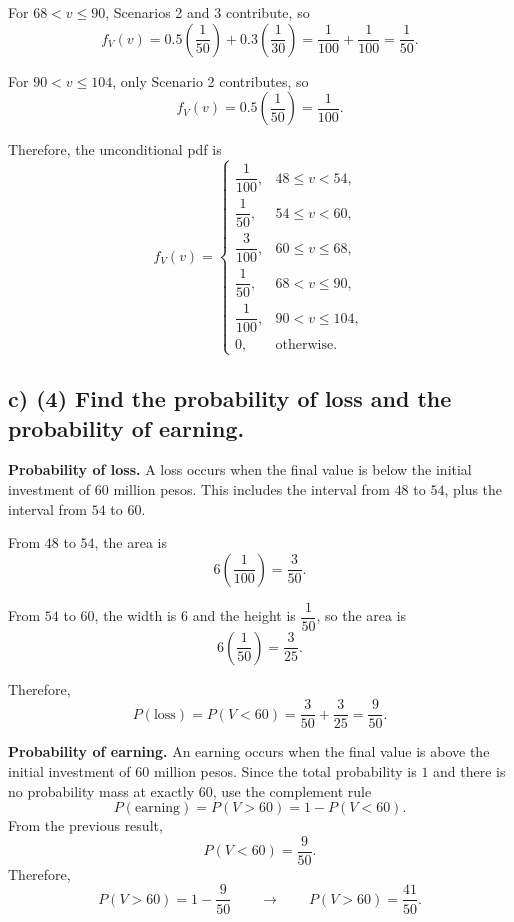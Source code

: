 For $68<v\le 90$, Scenarios 2 and 3 contribute, so
\[
f_V(v)=0.5\left(\frac{1}{50}\right)+0.3\left(\frac{1}{30}\right)
=\frac{1}{100}+\frac{1}{100}
=\frac{1}{50}.
\]

For $90<v\le 104$, only Scenario 2 contributes, so
\[
f_V(v)=0.5\left(\frac{1}{50}\right)=\frac{1}{100}.
\]

Therefore, the unconditional pdf is
\[
f_V(v)=
\begin{cases}
	\dfrac{1}{100}, & 48\le v<54,\\[6pt]
	\dfrac{1}{50}, & 54\le v<60,\\[6pt]
	\dfrac{3}{100}, & 60\le v\le 68,\\[6pt]
	\dfrac{1}{50}, & 68<v\le 90,\\[6pt]
	\dfrac{1}{100}, & 90<v\le 104,\\[6pt]
	0, & \text{otherwise.}
\end{cases}
\]



\subsection*{c) \textbf{(4)} Find the probability of loss and the probability of earning.}
\label{subsec:three-scenario-inventory-investment-c2-c}
\textbf{Probability of loss.} A loss occurs when the final value is below the initial investment of $60$ million pesos. This includes the interval from $48$ to $54$, plus the interval from $54$ to $60$.

From $48$ to $54$, the area is
\[
6\left(\frac{1}{100}\right)=\frac{3}{50}.
\]

From $54$ to $60$, the width is $6$ and the height is $\dfrac{1}{50}$, so the area is
\[
6\left(\frac{1}{50}\right)=\frac{3}{25}.
\]

Therefore,
\[
P(\text{loss})=P(V<60)=\frac{3}{50}+\frac{3}{25}=\frac{9}{50}.
\]

\textbf{Probability of earning.}
An earning occurs when the final value is above the initial investment of $60$ million pesos. Since the total probability is $1$ and there is no probability mass at exactly $60$, use the complement rule
\[
P(\text{earning})=P(V>60)=1-P(V<60).
\]
From the previous result,
\[
P(V<60)=\frac{9}{50}.
\]
Therefore,
\[
P(V>60)=1-\frac{9}{50}\qquad \longrightarrow \qquad P(V>60)=\frac{41}{50}.
\]

